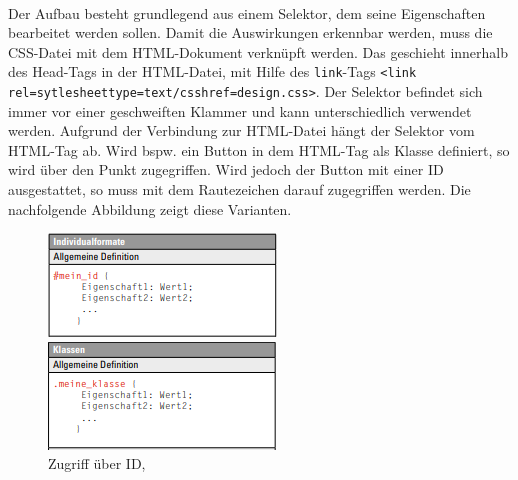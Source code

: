 \documentclass[a4paper,titlepage,halfparskip,12pt]{scrreprt}
\begin{document}
\begin{onehalfspacing}
\\Der Aufbau besteht grundlegend aus einem Selektor, dem seine Eigenschaften bearbeitet werden sollen. Damit die Auswirkungen erkennbar werden, muss die \ac{CSS}-Datei mit dem HTML-Dokument verknüpft werden. Das geschieht innerhalb des Head-Tags in der \ac{HTML}-Datei, mit Hilfe des \texttt{link}-Tags \texttt{<link rel=\dq sytlesheet\dq \;type=\dq text/css\dq \;href=\dq design.css\dq>}. Der Selektor befindet sich immer vor einer geschweiften Klammer und kann unterschiedlich verwendet werden. Aufgrund der Verbindung zur HTML-Datei hängt der Selektor vom \ac{HTML}-Tag ab. Wird bspw. ein Button in dem \ac{HTML}-Tag als Klasse definiert, so wird über den Punkt zugegriffen. Wird jedoch der Button mit einer ID ausgestattet, so muss mit dem Rautezeichen darauf zugegriffen werden. Die nachfolgende Abbildung zeigt diese Varianten.
\begin{figure}[h]
	\begin{minipage}[c]{.4\textwidth}
		\includegraphics[width=\textwidth]{images/CSSID}
		\caption{Zugriff über ID, \cite{buhler2017html5}} 
		\label{img:CSSID}
	\end{minipage}
	\hspace{.1\linewidth}%
	\begin{minipage}[c]{.4\textwidth}
		\includegraphics[width=\textwidth]{images/CSSKlasse}

\end{minipage}
\end{figure}
\end{onehalfspacing}
\end{document}
